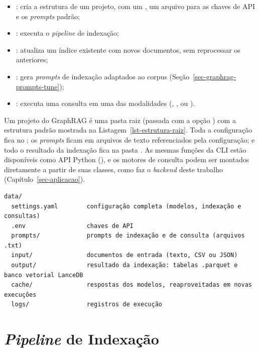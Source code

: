 \begin{itemize}
    \item {}: cria a estrutura de um projeto, com um , um arquivo  para as chaves de API e os \textit{prompts} padrão;
    \item {}: executa o \textit{pipeline} de indexação;
    \item {}: atualiza um índice existente com novos documentos, sem reprocessar os anteriores;
    \item {}: gera \textit{prompts} de indexação adaptados ao corpus (Seção~\ref{sec-graphrag-prompts-tune});
    \item {}: executa uma consulta em uma das modalidades (, ,  ou ).
\end{itemize}

Um projeto do GraphRAG é uma pasta raiz (passada com a opção ) com a estrutura padrão mostrada na Listagem~\ref{lst-estrutura-raiz}. Toda a configuração fica no ; os \textit{prompts} ficam em arquivos de texto referenciados pela configuração; e todo o resultado da indexação fica na pasta . As mesmas funções da CLI estão disponíveis como API Python (), e os motores de consulta podem ser montados diretamente a partir de suas classes, como faz o \textit{backend} deste trabalho (Capítulo~\ref{sec-aplicacao}).

\begin{lstlisting}[caption={Estrutura da pasta raiz de um projeto GraphRAG (a pasta \code{data/} deste trabalho).}, label=lst-estrutura-raiz]
data/
  settings.yaml        configuração completa (modelos, indexação e consultas)
  .env                 chaves de API 
  prompts/             prompts de indexação e de consulta (arquivos .txt)
  input/               documentos de entrada (texto, CSV ou JSON)
  output/              resultado da indexação: tabelas .parquet e banco vetorial LanceDB
  cache/               respostas dos modelos, reaproveitadas em novas execuções
  logs/                registros de execução
\end{lstlisting}

\section{\textit{Pipeline} de Indexação}
\label{sec-graphrag-indexacao}


